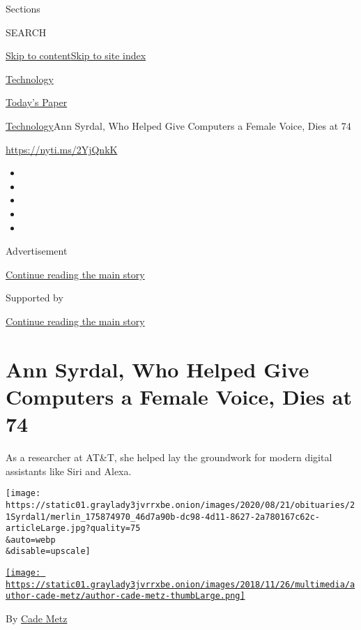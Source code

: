 Sections

SEARCH

\protect\hyperlink{site-content}{Skip to
content}\protect\hyperlink{site-index}{Skip to site index}

\href{https://www.nytimes3xbfgragh.onion/section/technology}{Technology}

\href{https://myaccount.nytimes3xbfgragh.onion/auth/login?response_type=cookie\&client_id=vi}{}

\href{https://www.nytimes3xbfgragh.onion/section/todayspaper}{Today's
Paper}

\href{/section/technology}{Technology}\textbar{}Ann Syrdal, Who Helped
Give Computers a Female Voice, Dies at 74

\url{https://nyti.ms/2YjQnkK}

\begin{itemize}
\item
\item
\item
\item
\item
\end{itemize}

Advertisement

\protect\hyperlink{after-top}{Continue reading the main story}

Supported by

\protect\hyperlink{after-sponsor}{Continue reading the main story}

\hypertarget{ann-syrdal-who-helped-give-computers-a-female-voice-dies-at-74}{%
\section{Ann Syrdal, Who Helped Give Computers a Female Voice, Dies at
74}\label{ann-syrdal-who-helped-give-computers-a-female-voice-dies-at-74}}

As a researcher at AT\&T, she helped lay the groundwork for modern
digital assistants like Siri and Alexa.

\texttt{[image: https://static01.graylady3jvrrxbe.onion/images/2020/08/21/obituaries/21Syrdal1/merlin\_175874970\_46d7a90b-dc98-4d11-8627-2a780167c62c-articleLarge.jpg?quality=75\\\&auto=webp\\\&disable=upscale]}

\href{https://www.nytimes3xbfgragh.onion/by/cade-metz}{\texttt{[image: https://static01.graylady3jvrrxbe.onion/images/2018/11/26/multimedia/author-cade-metz/author-cade-metz-thumbLarge.png]}}

By \href{https://www.nytimes3xbfgragh.onion/by/cade-metz}{Cade Metz}

